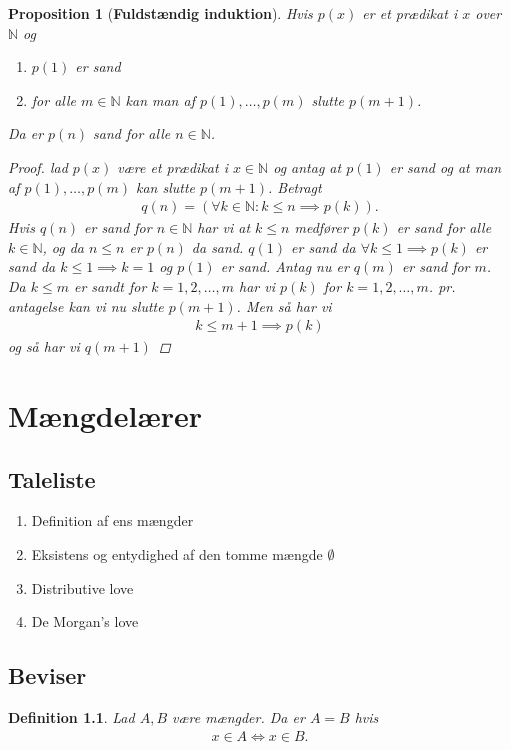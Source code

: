 \documentclass[10pt,twoside,openany,final]{memoir}
\theoremstyle{break}
\newtheorem{proposition}[section]{Proposition}
\newtheorem{definition}[section]{Definition}
\theoremstyle{Break}
\newcommand{\N}{\mathbb{N}}
\begin{document}
\begin{proposition}[\textbf{Fuldstændig induktion}]
Hvis $p(x)$ er et prædikat i $x$ over $\N$ og
\begin{enumerate}
\item $p(1)$ er sand
\item for alle $m \in \N$ kan man af $p(1), \dots , p(m)$ slutte $p(m+1)$.
\end{enumerate}
Da er $p(n)$ sand for alle $n \in \N$.
\begin{proof}
lad $p(x)$ være et prædikat i $x \in \N$ og antag at $p(1)$ er sand og at man af $p(1), \dots , p(m)$ kan slutte $p(m+1)$. Betragt
\begin{align*}
q(n) = (\forall k \in \N \colon k \leq n \implies p(k)).
\end{align*}
Hvis $q(n)$ er sand for $n \in \N$ har vi at $k \leq n$ medfører $p(k)$ er sand for alle $k \in \N$, og da $n \leq n$ er $p(n)$ da sand.
$q(1)$ er sand da $\forall k \leq 1 \implies p(k)$ er sand da $k \leq 1 \implies k = 1$ og $p(1)$ er sand. Antag nu er $q(m)$ er sand for $m$. Da $k \leq m$ er sandt for $k = 1, 2 , \dots , m$ har vi $p(k)$ for $k = 1, 2 , \dots , m$. pr. antagelse kan vi nu slutte $p(m+1)$. Men så har vi
\begin{align*}
k \leq m+1 \implies p(k)
\end{align*} 
og så har vi $q(m+1)$
\end{proof}
\end{proposition}

\chapter{Mængdelærer}
\section*{Taleliste}
\begin{enumerate}
\item Definition af ens mængder
\item Eksistens og entydighed af den tomme mængde $\emptyset$
\item Distributive love
\item De Morgan's love
\end{enumerate}

\section*{Beviser}
\begin{definition}
Lad $A,B$ være mængder. Da er $A=B$ hvis
\begin{align*}
x \in A \iff x \in B.
\end{align*}
\end{definition}
\end{document}
